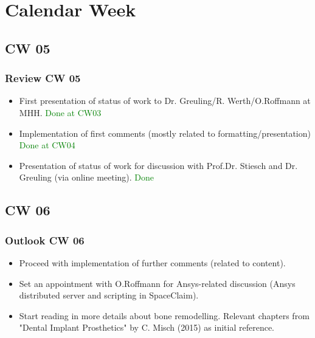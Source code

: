 \section{Calendar Week}
\subsection{CW 05}
\begin{frame}
  \frametitle{Review CW 05}
	\begin{itemize}
		\item First presentation of status of work to Dr. Greuling/R. Werth/O.Roffmann at MHH. \textcolor{green}{Done at CW03}
		\item Implementation of first comments (mostly related to formatting/presentation) \textcolor{green}{Done at CW04}
		\item Presentation of status of work for discussion with Prof.Dr. Stiesch and Dr. Greuling (via online meeting). \textcolor{green}{Done}
	\end{itemize}
\end{frame}


\subsection{CW 06}
\begin{frame}
  \frametitle{Outlook CW 06}
	\begin{itemize}
		\item Proceed with implementation of further comments (related to content).
		\item Set an appointment with O.Roffmann for Ansys-related discussion (Ansys distributed server and scripting in SpaceClaim).
		\item Start reading in more details about bone remodelling. Relevant chapters from "Dental Implant Prosthetics" by C. Misch (2015) as initial reference.
	\end{itemize}
\end{frame}

